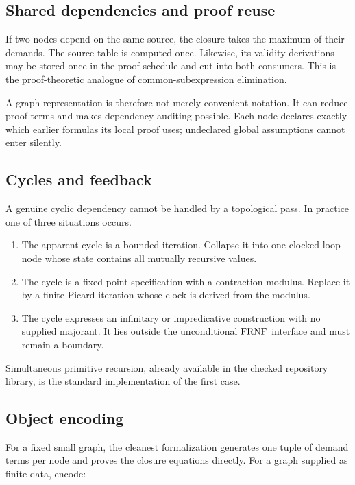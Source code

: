 \subsection{Shared dependencies and proof reuse}

If two nodes depend on the same source, the closure takes the maximum of their demands.
The source table is computed once.  Likewise, its validity derivations may be stored
once in the proof schedule and cut into both consumers.  This is the proof-theoretic
analogue of common-subexpression elimination.

A graph representation is therefore not merely convenient notation.  It can reduce
proof terms and makes dependency auditing possible.  Each node declares exactly which
earlier formulas its local proof uses; undeclared global assumptions cannot enter
silently.

\subsection{Cycles and feedback}

A genuine cyclic dependency cannot be handled by a topological pass.  In practice one
of three situations occurs.

\begin{enumerate}[label=(\roman*),leftmargin=2.4em]
\item The apparent cycle is a bounded iteration.  Collapse it into one clocked loop
node whose state contains all mutually recursive values.
\item The cycle is a fixed-point specification with a contraction modulus.  Replace it
by a finite Picard iteration whose clock is derived from the modulus.
\item The cycle expresses an infinitary or impredicative construction with no supplied
majorant.  It lies outside the unconditional \(\mathrm{FRNF}\) interface and must remain a
boundary.
\end{enumerate}

Simultaneous primitive recursion, already available in the checked repository library,
is the standard implementation of the first case.

\subsection{Object encoding}

For a fixed small graph, the cleanest formalization generates one tuple of demand terms
per node and proves the closure equations directly.  For a graph supplied as finite
data, encode:

